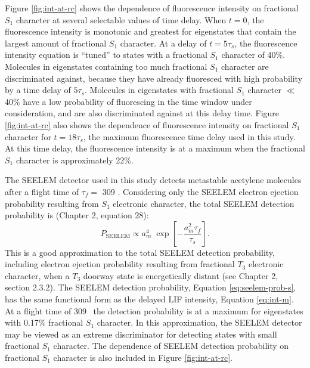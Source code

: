 \documentclass[12pt]{mitthesis}
\begin{document}
Figure \ref{fig:int-at-rc} shows the dependence of fluorescence
intensity on fractional $S_1$ character at several selectable values
of time delay.  When $t = 0$, the fluorescence intensity is monotonic
and greatest for eigenstates that contain the largest amount of
fractional $S_1$ character.  At a delay of $t = 5 \tau_s$, the
fluorescence intensity equation is ``tuned'' to states with a
fractional $S_1$ character of 40\%.  Molecules in eigenstates
containing too much fractional $S_1$ character are discriminated
against, because they have already fluoresced with high probability by
a time delay of $5 \tau_s$.  Molecules in eigenstates with fractional
$S_1$ character $\ll$ 40\% have a low probability of fluorescing in
the time window under consideration, and are also discriminated
against at this delay time.  Figure \ref{fig:int-at-rc} also shows the
dependence of fluorescence intensity on fractional $S_1$ character for
$t=18\tau_s$, the maximum fluorescence time delay used in this study.
At this time delay, the fluorescence intensity is at a maximum when
the fractional $S_1$ character is approximately 22\%.

The SEELEM detector used in this study detects metastable acetylene
molecules after a flight time of $\tau_f =$ 309
\microsec.  Considering only the SEELEM electron ejection probability
resulting from $S_1$ electronic character, the total SEELEM detection
probability is (Chapter 2, equation 28):
\begin{equation}
  \label{eq:seelem-prob-s}
  P_{\text{SEELEM}} \propto 
    a_m^4 \; 
    \exp \left [ 
      -\frac{a_m^2 \tau_f}{\tau_s} 
    \right ].
\end{equation}
This is a good approximation to the total SEELEM detection
probability, including electron ejection probability resulting from
fractional $T_3$ electronic character, when a $T_3$ doorway state is
energetically distant (see Chapter 2, section 2.3.2).  The SEELEM
detection probability, Equation \ref{eq:seelem-prob-s}, has the same
functional form as the delayed LIF intensity, Equation \ref{eq:int-m}.
At a flight time of 309 \microsec\, the detection probability is at a
maximum for eigenstates with 0.17\% fractional $S_1$ character.  In
this approximation, the SEELEM detector may be viewed as an extreme
discriminator for detecting states with small fractional $S_1$
character.  The dependence of SEELEM detection probability on
fractional $S_1$ character is also included in Figure
\ref{fig:int-at-rc}.
\end{document}
